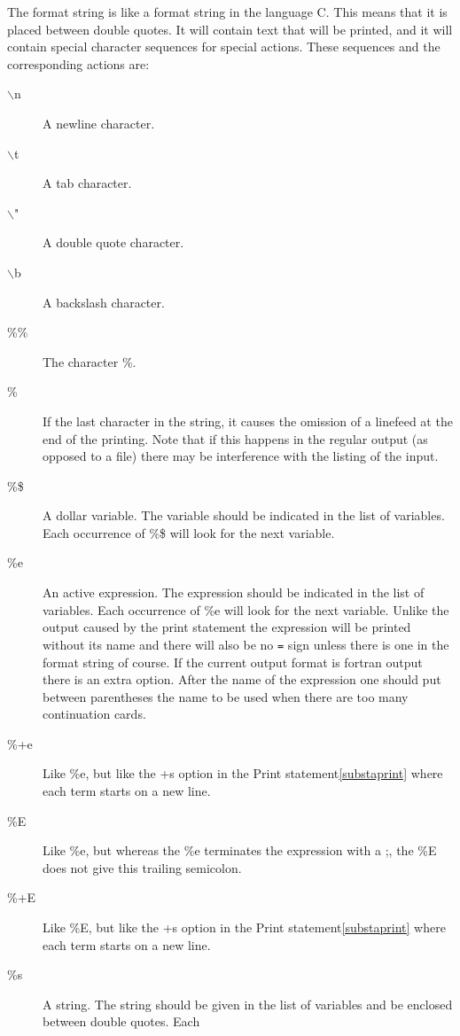 The format string is like a format string in the 
language C. This means 
that it is placed between double quotes. It will contain text that will be 
printed, and it will contain special character sequences for special 
actions. These sequences and the corresponding actions are:
\begin{description}
\item[$\backslash$n] A newline character.
\item[$\backslash$t] A tab character.
\item[$\backslash$"] A double quote character.
\item[$\backslash$b] A backslash character.
\item[\%\%] The character \%\index{\%}.
\item[\%] If the last character in the string, it causes the omission of a 
linefeed at the end of the printing. Note that if this 
happens in the regular output (as opposed to a file) there may be 
interference with the listing of the input.
\item[\%\$] A dollar variable. The variable should be 
indicated in the list of variables. Each occurrence of \%\$ will look for 
the next variable.
\item[\%e] An active expression. The expression should be 
indicated in the list of variables. Each occurrence of \%e will look for 
the next variable. Unlike the output caused by the print statement the 
expression will be printed without its name and there will also be no 
\verb:=: sign unless there is one in the format string of course. If the 
current output format is fortran output there is an extra option. After the 
name of the expression one should put between parentheses the name to be 
used when there are too many continuation cards.
\item[\%+e] Like \%e, but like the +s option in the Print 
statement\ref{substaprint} where each term starts on a new line.
\item[\%E] Like \%e, but whereas the \%e terminates the expression with a 
;, the \%E does not give this trailing semicolon.
\item[\%+E] Like \%E, but like the +s option in the Print 
statement\ref{substaprint} where each term starts on a new line.
\item[\%s] A string. The string should be 
given in the list of variables and be enclosed between double quotes. Each 

\end{description}
